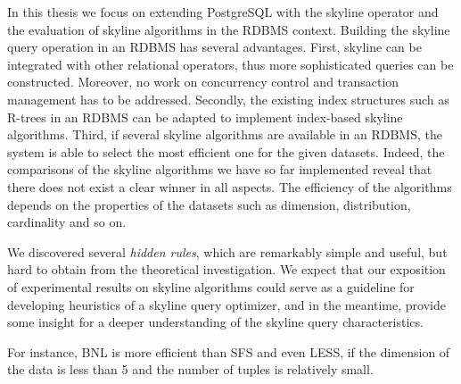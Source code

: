 In this thesis we focus on extending PostgreSQL with the skyline
operator and the evaluation of skyline algorithms in the RDBMS context.
Building the skyline query operation in an RDBMS has
several advantages.  First, skyline can be integrated with other
relational operators, thus more sophisticated queries can be
constructed.  Moreover, no work on concurrency control and transaction
management has to be addressed.  Secondly, the existing index structures
such as R-trees in an RDBMS can be adapted to implement index-based
skyline algorithms.  Third, if several skyline algorithms are
available in an RDBMS, the system is able to select the most efficient
one for the given datasets.  Indeed, the comparisons of the skyline
algorithms we have so far implemented reveal that there does not exist
a clear winner in all aspects.  The efficiency of the algorithms
depends on the properties of the datasets such as dimension,
distribution, cardinality and so on.

We discovered several \emph{hidden rules}, which are remarkably simple
and useful, but hard to obtain from the theoretical investigation.  We
expect that our exposition of experimental results on skyline
algorithms could serve as a guideline for developing heuristics of a
skyline query optimizer, and in the meantime, provide some insight for
a deeper understanding of the skyline query characteristics.

For instance, BNL is more efficient than SFS and even LESS, if the
dimension of the data is less than 5 and the number of tuples is
relatively small.

